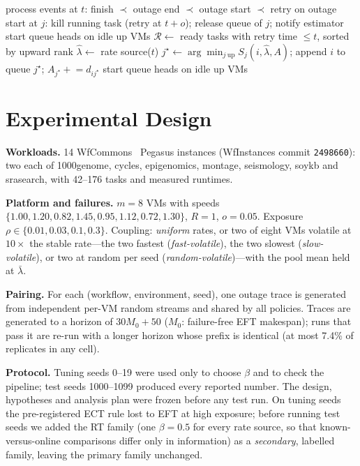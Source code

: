 \documentclass[10pt,twocolumn,letterpaper]{article}
\newcommand{\EFT}{\textsf{EFT}}
\newcommand{\ECT}{\textsf{ECT}}
\newcommand{\RT}{\textsf{RT}}
\begin{document}
\begin{algorithm}[t]\small
\caption{Shared online dispatch loop (one invocation per event time)}\label{alg:dispatch}
\begin{algorithmic}[1]
\State process events at $t$: finish $\prec$ outage end $\prec$ outage start $\prec$ retry
\State on outage start at $j$: kill running task (retry at $t+o$); release queue of $j$; notify estimator
\State start queue heads on idle up VMs
\State $\mathcal{R} \gets$ ready tasks with retry time $\le t$, sorted by upward rank
  \State $\hat\lambda \gets$ rate source($t$) 
  \State $j^\star \gets \arg\min_{j\ \text{up}} S_j(i,\hat\lambda, A)$; append $i$ to queue $j^\star$; $A_{j^\star} \mathrel{+}= d_{ij^\star}$
\EndFor
\State start queue heads on idle up VMs
\end{algorithmic}\end{algorithm}

\section{Experimental Design}
\textbf{Workloads.} 14 WfCommons~\cite{coleman2022wfcommons} Pegasus instances (WfInstances commit \texttt{2498660}):
two each of 1000genome, cycles, epigenomics, montage, seismology, soykb and srasearch, with 42--176 tasks and
measured runtimes.

\textbf{Platform and failures.} $m=8$ VMs with speeds $\{1.00, 1.20, 0.82, 1.45, 0.95, 1.12, 0.72, 1.30\}$,
$R=1$, $o=0.05$. Exposure $\rho \in \{0.01, 0.03, 0.1, 0.3\}$. Coupling: \emph{uniform} rates, or two of eight VMs
volatile at $10\times$ the stable rate---the two fastest (\emph{fast-volatile}), the two slowest
(\emph{slow-volatile}), or two at random per seed (\emph{random-volatile})---with the pool mean held at $\bar\lambda$.

\textbf{Pairing.} For each (workflow, environment, seed), one outage trace is generated from independent per-VM
random streams and shared by all policies. Traces are generated to a horizon of $30M_0+50$ ($M_0$: failure-free EFT
makespan); runs that pass it are re-run with a longer horizon whose prefix is identical (at most 7.4\% of
replicates in any cell).

\textbf{Protocol.} Tuning seeds 0--19 were used only to choose $\beta$ and to check the pipeline; test seeds
1000--1099 produced every reported number. The design, hypotheses and analysis plan were frozen before any test
run. On tuning seeds the pre-registered \ECT{} rule lost to \EFT{} at high exposure; before running test seeds we
added the \RT{} family (one $\beta=0.5$ for every rate source, so that known-versus-online comparisons differ only in
information) as a \emph{secondary}, labelled family, leaving the primary family unchanged.
\end{document}
